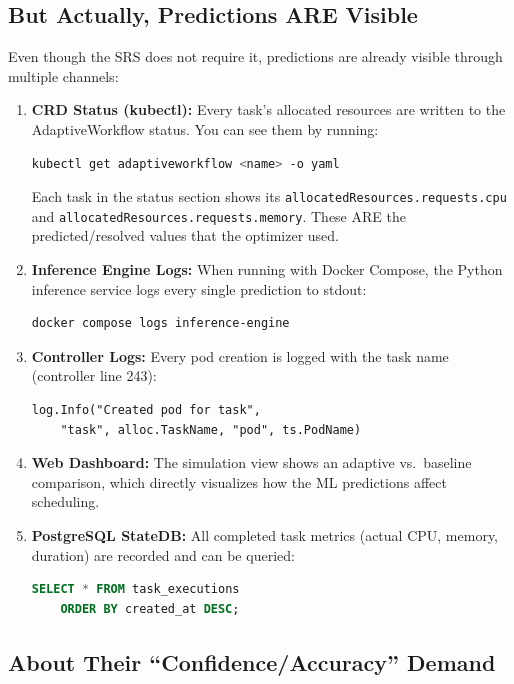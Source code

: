 \documentclass[12pt,a4paper]{article}
\begin{document}
\subsection{But Actually, Predictions ARE Visible}

Even though the SRS does not require it, predictions are already visible through multiple channels:

\begin{enumerate}
  \item \textbf{CRD Status (kubectl):} Every task's allocated resources are written to the AdaptiveWorkflow status. You can see them by running:
  \begin{lstlisting}[language=bash]
kubectl get adaptiveworkflow <name> -o yaml
  \end{lstlisting}
  Each task in the status section shows its \texttt{allocatedResources.requests.cpu} and \texttt{allocatedResources.requests.memory}. These ARE the predicted/resolved values that the optimizer used.

  \item \textbf{Inference Engine Logs:} When running with Docker Compose, the Python inference service logs every single prediction to stdout:
  \begin{lstlisting}[language=bash]
docker compose logs inference-engine
  \end{lstlisting}

  \item \textbf{Controller Logs:} Every pod creation is logged with the task name (controller line 243):
  \begin{lstlisting}
log.Info("Created pod for task",
    "task", alloc.TaskName, "pod", ts.PodName)
  \end{lstlisting}

  \item \textbf{Web Dashboard:} The simulation view shows an adaptive vs.\ baseline comparison, which directly visualizes how the ML predictions affect scheduling.

  \item \textbf{PostgreSQL StateDB:} All completed task metrics (actual CPU, memory, duration) are recorded and can be queried:
  \begin{lstlisting}[language=SQL]
SELECT * FROM task_executions
    ORDER BY created_at DESC;
  \end{lstlisting}
\end{enumerate}

\subsection{About Their ``Confidence/Accuracy'' Demand}
\end{document}
